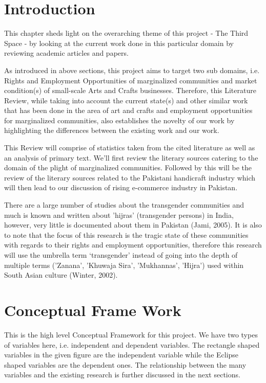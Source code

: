     
\section{Introduction}

This chapter sheds light on the overarching theme of this project - The Third Space - by looking at the current work done in this particular domain by reviewing academic articles and papers.

As introduced in above sections, this project aims to target two sub domains, i.e. Rights and Employment Opportunities of marginalized communities and market condition(s) of small-scale Arts and Crafts businesses. Therefore, this Literature Review, while taking into account the current state(s) and other similar work that has been done in the area of art and crafts and employment opportunities for marginalized communities, also establishes the novelty of our work by highlighting the differences between the existing work and our work.

This Review will comprise of statistics taken from the cited literature as well as an analysis of primary text. We'll first review the literary sources catering to the domain of the plight of marginalized communities. Followed by this will be the review of the literary sources related to the Pakistani handicraft industry which will then lead to our discussion of rising e-commerce industry in Pakistan.

There are a large number of studies about the transgender communities and much is known and written about 'hijras' (transgender persons) in India, however, very little is documented about them in Pakistan (Jami, 2005). It is also to note that the focus of this research is the tragic state of these communities with regards to their rights and employment opportunities, therefore this research will use the umbrella term `transgender' instead of going into the depth of multiple terms ('Zanana', 'Khuwaja Sira', 'Mukhannas', 'Hijra') used within South Asian culture (Winter, 2002). 

\section{Conceptual Frame Work}

This is the high level Conceptual Framework for this project. We have two types of variables here, i.e. independent and dependent variables. The rectangle shaped variables in the given figure are the independent variable while the Eclipse shaped variables are the dependent ones. The relationship between the many variables and the existing research is further discussed in the next sections. 

